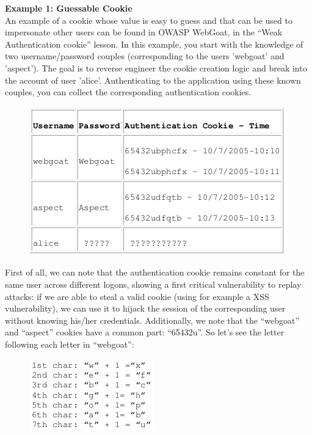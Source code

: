 			{\bf Example 1: Guessable Cookie} \\
			An example of a cookie whose value is easy to guess and that can be used to impersonate 
			other users can be found in OWASP WebGoat, in the “Weak Authentication cookie” lesson. 
			In this example, you start with the knowledge of two username/password couples 
			(corresponding to the users 'webgoat' and 'aspect'). The goal is to reverse engineer 
			the cookie creation logic and break into the account of user 'alice'. 
			Authenticating to the application using these known couples, you can collect the 
			corresponding authentication cookies.

			\begin{figure}[H]
				\includegraphics[scale=0.5]{pics/exampleCookie.png}
			\end{figure}

			First of all, we can note that the authentication cookie remains constant for the same 
			user across different logons, showing a first critical vulnerability to replay attacks: 
			if we are able to steal a valid cookie (using for example a XSS vulnerability), we
			can use it to hijack the session of the corresponding user without knowing his/her 
			credentials. Additionally, we note that the “webgoat” and “aspect” cookies have a 
			common part: “65432u”. So let's see the letter following each letter in “webgoat”:

			\begin{figure}[H]
				\includegraphics[scale=0.5]{pics/webgoat.png}
			\end{figure}

